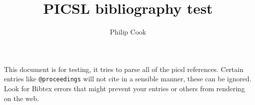 \documentclass[11pt]{amsart}
\title{PICSL bibliography test}
\author{Philip Cook}
\begin{document}
\maketitle

This document is for testing, it tries to parse all of the picsl references. Certain entries like \texttt{@proceedings} will not cite in a sensible manner, these can be ignored.
Look for Bibtex errors that might prevent your entries or others from rendering on the web.


\nocite{*} 



\end{document}
